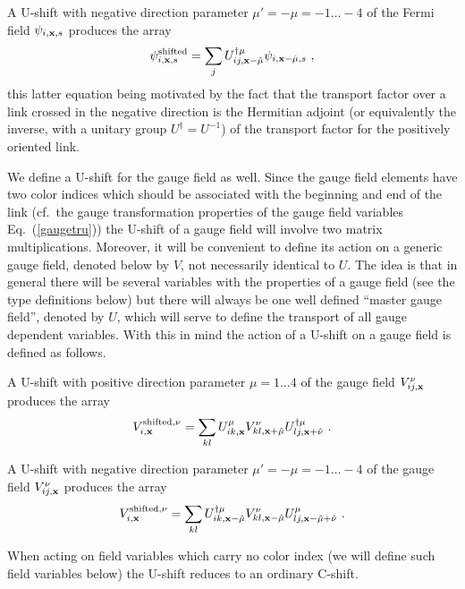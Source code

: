 A U-shift with negative direction parameter 
$\mu' = -\mu = -1 \dots -4$ of the
Fermi field $\psi_{i,{\bf x},s}$ produces the array 
%
\begin{equation}
\psi^{\rm shifted}_{i,{\bf x},s} = \sum_j U_{ij,{\bf x}-\hat\mu}^{\dagger \mu}
\psi_{i,{{\bf x}-\hat\mu},s} \ ,
\label{negshiftfm}
\end{equation}
%
this latter equation being motivated by the fact that the transport
factor over a link crossed in the negative direction is the 
Hermitian adjoint (or equivalently the
inverse, with a unitary group $U^{\dagger}=U^{-1}$)
of the transport factor for the positively oriented link.

We define a U-shift for the gauge field as well.  Since the gauge field
elements have two color indices which should be associated with the
beginning and end of the link (cf.~the gauge transformation properties
of the gauge field variables Eq.~(\ref{gaugetru})) the U-shift of a gauge
field will involve two matrix multiplications.  Moreover, it will be
convenient to define its action on a generic gauge field, denoted below by $V$,
not necessarily identical to $U$.  The idea is that in general there  
will be several variables with the properties of a gauge field (see 
the type definitions below) but there will always be one
well defined ``master gauge field'', denoted by $U$, which will serve
to define the transport of all gauge dependent variables.  With this
in mind the action of a U-shift on a gauge field is defined as follows.

A U-shift with positive direction parameter $\mu = 1 \dots 4$ of the
gauge field $V_{ij,{\bf x}}^{\nu}$ produces the array 
%
\begin{equation}
V^{{\rm shifted},\nu}_{i,{\bf x}} = \sum_{kl} U_{ik,{\bf x}}^{\mu}
V_{kl,{{\bf x}+\hat\mu}}^{\nu} U_{lj,{\bf x}+\hat\nu}^{\dagger \mu}\ .
\label{shiftv}
\end{equation}
%

A U-shift with negative direction parameter 
$\mu' = -\mu = -1 \dots -4$ of the
gauge field $V_{ij,{\bf x}}^{\nu}$ produces the array 
%
\begin{equation}
V^{{\rm shifted},\nu}_{i,{\bf x}} = 
\sum_{kl} U_{ik,{\bf x}-\hat\mu}^{\dagger \mu}
V_{kl,{{\bf x}-\hat\mu}}^{\nu} U_{lj,{\bf x}-\hat\mu+\hat\nu}^{\mu}\ .
\label{negshiftv}
\end{equation}
%

When acting on field variables which carry no color index (we will define
such field variables below) the U-shift reduces to an ordinary C-shift.

